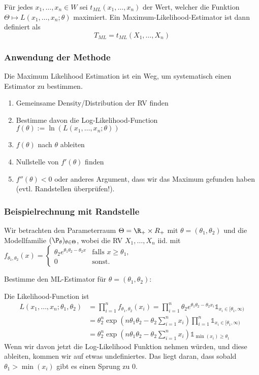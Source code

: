 \noindent Für jedes \(x_1, \ldots, x_n \in W\) sei \(t_{ML}(x_1, \ldots, x_n)\) der Wert, welcher die Funktion \(\Theta \mapsto L(x_1, \ldots, x_n; \theta)\) maximiert. Ein Maximum-Likelihood-Estimator ist dann definiert als
\[T_{ML} = t_{ML}(X_1, \ldots, X_n)\]

\subsubsection{Anwendung der Methode}
Die Maximum Likelihood Estimation ist ein Weg, um systematisch einen Estimator zu bestimmen.
\begin{enumerate}
	\item Gemeinsame Density/Distribution der RV finden
	\item Bestimme davon die Log-Likelihood-Function\\ \(f(\theta) := \ln(L(x_1, \ldots, x_n;\theta))\)
	\item \(f(\theta)\) nach \(\theta\) ableiten
	\item Nullstelle von \(f'(\theta)\) finden
	\item $f''(\theta) < 0$ oder anderes Argument, dass wir das Maximum gefunden haben (evtl. Randstellen überprüfen!).
\end{enumerate}

\subsubsection*{Beispielrechnung mit Randstelle}
Wir betrachten den Parameterraum $\Theta = \R_+ \times R_+$ mit $\theta = (\theta_1, \theta_2)$ und die Modellfamilie $(\P_\theta)_{\theta\in \Theta}$, wobei die RV $X_1, \ldots, X_n$ iid. mit $f_{\theta_1, \theta_2}(x) = \begin{cases}
    \theta_2e^{\theta_1\theta_2 - \theta_2x} & \text{falls }x \geq \theta_1,\\
    0 & \text{sonst.}
\end{cases}$

Bestimme den ML-Estimator für $\theta = (\theta_1, \theta_2)$:

Die Likelihood-Function ist 
\begin{align*}
    L(x_1, \dots, x_n; \theta_1, \theta_2) &= \prod_{i = 1}^{n}f_{\theta_1, \theta_2}(x_i) = \prod_{i = 1}^n \theta_2e^{\theta_1\theta_2 - \theta_2 x_i} \mathds{1}_{x_i \in [\theta_1, \infty)}\\
    &= \theta_2^n \exp\left(n\theta_1\theta_2 - \theta_2 \sum_{i=1}^n x_i\right) \prod_{i=1}^n \mathds{1}_{x_i \in [\theta_1, \infty)}\\
    &= \theta_2^n \exp\left(n\theta_1\theta_2 - \theta_2 \sum_{i=1}^n x_i\right) \mathds{1}_{\min(x_i) \geq \theta_1}
\end{align*}
Wenn wir davon jetzt die Log-Likelihood Funktion nehmen würden, und diese ableiten, kommen wir auf etwas undefiniertes. 
Das liegt daran, dass sobald $\theta_1 > \min(x_i)$ gibt es einen Sprung zu $0$.

